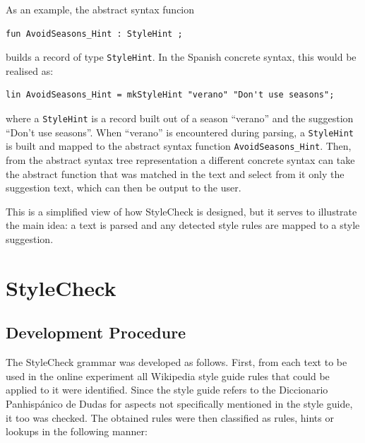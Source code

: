 As an example, the abstract syntax funcion

\begin{lstlisting}[numbers=none]
fun AvoidSeasons_Hint : StyleHint ;
\end{lstlisting}

%

\noindent builds a record of type \texttt{StyleHint}. In the Spanish concrete syntax, this would be realised as:

\begin{lstlisting}[numbers=none]
lin AvoidSeasons_Hint = mkStyleHint "verano" "Don't use seasons";
\end{lstlisting}

\noindent where a \texttt{StyleHint} is a record built out of a season ``verano'' and the suggestion ``Don't use seasons''. When ``verano'' is encountered during parsing, a \texttt{StyleHint} is built and mapped to the abstract syntax function \texttt{AvoidSeasons\_Hint}. Then, from the abstract syntax tree representation a different concrete syntax can take the abstract function that was matched in the text and select from it only the suggestion text, which can then be output to the user.

This is a simplified view of how StyleCheck is designed, but it serves to illustrate the main idea: a text is parsed and any detected style rules are mapped to a style suggestion.



\section{StyleCheck}

\subsection{Development Procedure}

\noindent The StyleCheck grammar was developed as follows. First, from each text to be used in the online experiment all Wikipedia style guide rules that could be applied to it were identified. Since the style guide refers to the Diccionario Panhispánico de Dudas \parencite{real2005dudas} for aspects not specifically mentioned in the style guide, it too was checked. The obtained rules were then classified as rules, hints or lookups in the following manner:

